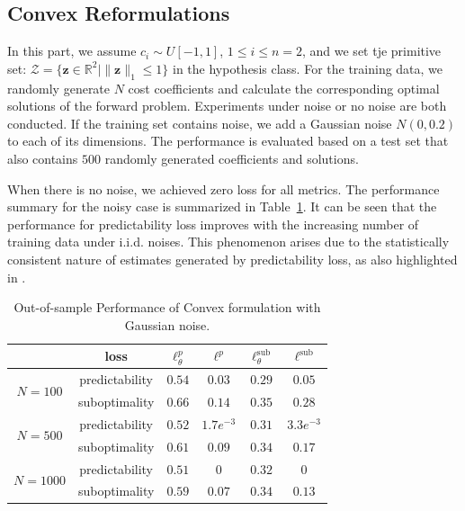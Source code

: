 \documentclass{article}
\def\Z{\mathcal{Z}}
\def\z{\bm{z}}
\theoremstyle{plain}
\begin{document}
\subsection{Convex Reformulations}

In this part, we assume $c_i \sim U[-1,1]$, $1 \leq i \leq n = 2$, and we set tje primitive set: $\displaystyle \Z = \{\z \in \mathbb{R}^2 \big| \|\z\|_1 \leq 1\}$ in the hypothesis class.
For the training data, we randomly generate $N$ cost coefficients and calculate the corresponding optimal solutions of the forward problem. Experiments under noise or no noise are both conducted. If the training set contains noise, we add a Gaussian noise $N(0,0.2)$ to each of its dimensions. The performance is evaluated based on a test set that also contains $500$ randomly generated coefficients and solutions. 

When there is no noise, we achieved zero loss for all metrics. The performance summary for the noisy case is summarized in Table~\ref{tab:multicol_convex}. It can be seen that the performance for predictability loss improves with the increasing number of training data under i.i.d. noises. This phenomenon arises due to the statistically consistent nature of estimates generated by predictability loss, as also highlighted in \cite{aswani2018inverse}. 
 

\begin{table}[h!]
\caption{Out-of-sample Performance of Convex formulation with Gaussian noise.}\label{tab:multicol_convex}
\begin{center}
\small{
\begin{tabular}{|c|c|c|c|c|c|}
    \hline
    & loss &$\ell_\theta^p$ & $\ell^p$ &  $\ell_\theta^\text{sub}$ &  $\ell^\text{sub}$ \\
    \hline
    \multirow{2}{*}{$N=100$}& predictability &  $0.54$ & $0.03$ & $0.29$ & $0.05$ \\
       \cline{2-6}
       & suboptimality & $0.66$ & $0.14$ & $0.35$ & $0.28$\\
    \hline
    \hline
    \multirow{2}{*}{$N=500$}& predictability &  $0.52$ & $1.7e^{-3}$ & $0.31$ & $3.3e^{-3}$ \\
       \cline{2-6}
       & suboptimality & $0.61$ & $0.09$ & $0.34$ & $0.17$\\
    \hline
    \hline
    \multirow{2}{*}{$N=1000$}& predictability &  $0.51$ & $0$ & $0.32$ & $0$ \\
    \cline{2-6}
       & suboptimality & $0.59$ & $0.07$ & $0.34$ & $0.13$\\
    \hline
\end{tabular}}
\end{center}
\vskip -0.1in
\end{table}
\end{document}
